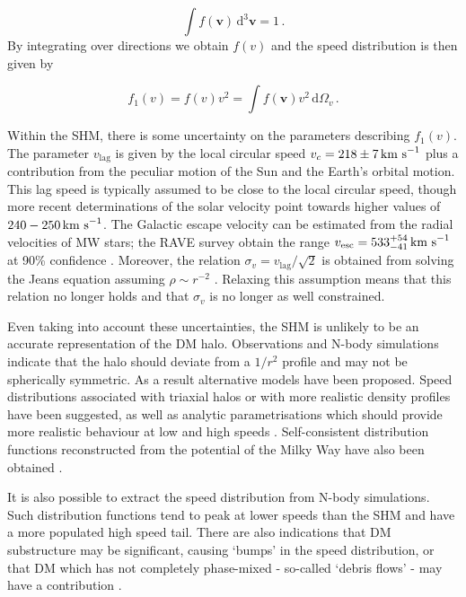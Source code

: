 \begin{equation}
\label{eq:DD:normalization}
\int f(\textbf{v}) \, \mathrm{d}^3\textbf{v} = 1\,.
\end{equation}
By integrating over directions we obtain $f(v)$ and the speed distribution is then given by

\begin{equation}
f_1(v) = f(v) v^2 = \int f(\textbf{v}) v^2 \, \mathrm{d}\Omega_v\,. 
\end{equation} 

Within the SHM, there is some uncertainty on the parameters describing $f_1(v)$. The parameter $v_\textrm{lag}$ is given by the local circular speed $v_c = 218 \pm 7 \,\textrm{km s}^{-1}$ \cite{Kerr:1986,Feast:1997} plus a contribution from the peculiar motion of the Sun and the Earth's orbital motion. This lag speed is typically assumed to be close to the local circular speed, though more recent determinations of the solar velocity point towards higher values \cite{Schonrich:2012,Bovy:2012a} of $240-250 \,\textrm{km s}^{-1}$. The Galactic escape velocity can be estimated from the radial velocities of MW stars; the RAVE survey obtain the range $v_\textrm{esc} = 533_{-41}^{+54} \,\textrm{km s}^{-1}$ at 90\% confidence \cite{RAVE:2007, RAVE:2014}. Moreover, the relation $\sigma_v =  v_\textrm{lag}/\sqrt{2}$ is obtained from solving the Jeans equation assuming $\rho \sim r^{-2}$ \cite{Binney:2008}. Relaxing this assumption means that this relation no longer holds and that $\sigma_v$ is no longer as well constrained. 

Even taking into account these uncertainties, the SHM is unlikely to be an accurate representation of the DM halo. Observations and N-body simulations indicate that the halo should deviate from a $1/r^2$ profile and may not be spherically symmetric. As a result alternative models have been proposed. Speed distributions associated with triaxial halos \cite{Evans:2000} or with more realistic density profiles \cite{Widrow:2000} have been suggested, as well as analytic parametrisations which should provide more realistic behaviour at low and high speeds \cite{Lisanti:2010}. Self-consistent distribution functions reconstructed from the potential of the Milky Way have also been obtained \cite{Bhattacharjee:2012,Fornasa:2013}.

It is also possible to extract the speed distribution from N-body simulations. Such distribution functions tend \cite{Vogelsberger:2009, Kuhlen:2010, Mao:2012} to peak at lower speeds than the SHM and have a more populated high speed tail. There are also indications that DM substructure may be significant, causing `bumps' in the speed distribution, or that DM which has not completely phase-mixed - so-called `debris flows' - may have a contribution \cite{Kuhlen:2012}. 

